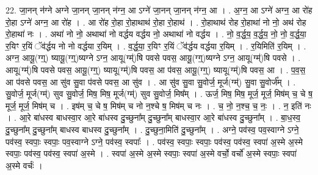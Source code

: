 \documentclass[17pt]{extarticle}
\begin{document}
22. जा॒नन् न॑ग्ने अग्ने जा॒नन् जा॒नन् न॑ग्न॒ आ ऽग्ने॑ जा॒नन् जा॒नन् न॑ग्न॒ आ । . अ॒ग्न॒ आ ऽग्ने॑ अग्न॒ आ रो॑ह रो॒हा ऽग्ने॑ अग्न॒ आ रो॑ह । . आ रो॑ह रो॒हा रो॒हाथाथ॑ रो॒हा रो॒हाथ॑ । . रो॒हाथाथ॑ रोह रो॒हाथा॑ नो नो॒ अथ॑ रोह रो॒हाथा॑ नः । . अथा॑ नो नो॒ अथाथा॑ नो वर्द्धय वर्द्धय नो॒ अथाथा॑ नो वर्द्धय । . नो॒ व॒र्द्ध॒य॒ व॒र्द्ध॒य॒ नो॒ नो॒ व॒र्द्ध॒या॒ र॒यिꣳ र॒यिं ॅव॑र्द्धय नो नो वर्द्धया र॒यिम् । . व॒र्द्ध॒या॒ र॒यिꣳ र॒यिं ॅव॑र्द्धय वर्द्धया र॒यिम् । . र॒यिमिति॑ र॒यिम् । . अग्न॒ आयू॒(ग्ग्॒) ष्यायू॒(ग्ग्॒)ष्यग्ने ऽग्न॒ आयू(ग्म्॑)षि पवसे पवस॒ आयू॒(ग्ग्॒)ष्यग्ने ऽग्न॒ आयू(ग्म्॑)षि पवसे । . आयू(ग्म्॑)षि पवसे पवस॒ आयू॒(ग्ग्॒) ष्यायू(ग्म्॑)षि पवस॒ आ प॑वस॒ आयू॒(ग्ग्॒) ष्यायू(ग्म्॑)षि पवस॒ आ । . प॒व॒स॒ आ प॑वसे पवस॒ आ सु॑व सु॒वा प॑वसे पवस॒ आ सु॑व । . आ सु॑व सु॒वा सु॒वोर्ज॒ मूर्ज(ग्म्॑) सु॒वा सु॒वोर्ज᳚म् । . सु॒वोर्ज॒ मूर्ज(ग्म्॑) सुव सु॒वोर्ज॒ मिष॒ मिष॒ मूर्ज(ग्म्॑) सुव सु॒वोर्ज॒ मिष᳚म् । . ऊर्ज॒ मिष॒ मिष॒ मूर्ज॒ मूर्ज॒ मिष॑म् च॒ चे ष॒ मूर्ज॒ मूर्ज॒ मिष॑म् च । . इष॑म् च॒ चे ष॒ मिष॑म् च नो न॒श्चे ष॒ मिष॑म् च नः । . च॒ नो॒ न॒श्च॒ च॒ नः॒ । . न॒ इति॑ नः । . आ॒रे बा॑धस्व बाधस्वा॒र आ॒रे बा॑धस्व दु॒च्छुना᳚म् दु॒च्छुना᳚म् बाधस्वा॒र आ॒रे बा॑धस्व दु॒च्छुना᳚म् । . बा॒ध॒स्व॒ दु॒च्छुना᳚म् दु॒च्छुना᳚म् बाधस्व बाधस्व दु॒च्छुना᳚म् । . दु॒च्छुना॒मिति॑ दु॒च्छुना᳚म् । . अग्ने॒ पव॑स्व॒ पव॒स्वाग्ने ऽग्ने॒ पव॑स्व॒ स्वपाः॒ स्वपाः॒ पव॒स्वाग्ने ऽग्ने॒ पव॑स्व॒ स्वपाः᳚ । . पव॑स्व॒ स्वपाः॒ स्वपाः॒ पव॑स्व॒ पव॑स्व॒ स्वपा॑ अ॒स्मे अ॒स्मे स्वपाः॒ पव॑स्व॒ पव॑स्व॒ स्वपा॑ अ॒स्मे । . स्वपा॑ अ॒स्मे अ॒स्मे स्वपाः॒ स्वपा॑ अ॒स्मे वर्चो॒ वर्चो॑ अ॒स्मे स्वपाः॒ स्वपा॑ अ॒स्मे वर्चः॑ । \newline
\end{document}
